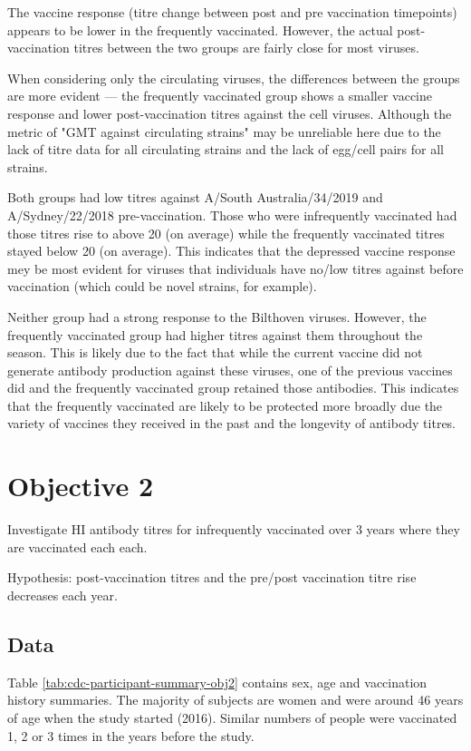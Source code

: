\documentclass[12pt]{article}
\begin{document}
The vaccine response (titre change between post and pre vaccination timepoints)
appears to be lower in the frequently vaccinated. However, the actual
post-vaccination titres between the two groups are fairly close for most viruses.

When considering only the circulating viruses, the differences between the groups are more evident --- the frequently vaccinated group shows a smaller vaccine response and lower post-vaccination titres against the cell viruses. Although the metric of "GMT against circulating strains" may be unreliable here due to the lack of titre data for all circulating strains and the lack of egg/cell pairs for all strains.

Both groups had low titres against A/South Australia/34/2019 and A/Sydney/22/2018 pre-vaccination. Those who were infrequently vaccinated had those titres rise to above 20 (on average) while the frequently vaccinated titres stayed below 20 (on average). This indicates that the depressed vaccine response mey be most evident for viruses that individuals have no/low titres against before vaccination (which could be novel strains, for example).

Neither group had a strong response to the Bilthoven viruses. However, the frequently vaccinated group had higher titres against them throughout the season. This is likely due to the fact that while the current vaccine did not generate antibody production against these viruses, one of the previous vaccines did and the frequently vaccinated group retained those antibodies. This indicates that the frequently vaccinated are likely to be protected more broadly due the variety of vaccines they received in the past and the longevity of antibody titres.

\section{Objective 2}

Investigate HI antibody titres for infrequently vaccinated over 3 years where
they are vaccinated each each.

Hypothesis: post-vaccination titres and the pre/post vaccination titre rise
decreases each year.

\subsection{Data}

Table \ref{tab:cdc-participant-summary-obj2} contains sex, age and
vaccination history summaries.
The majority of subjects are
women and were around 46 years of age when the study started (2016).
Similar numbers of people were vaccinated 1, 2 or 3 times in the years before
the study.
\end{document}
